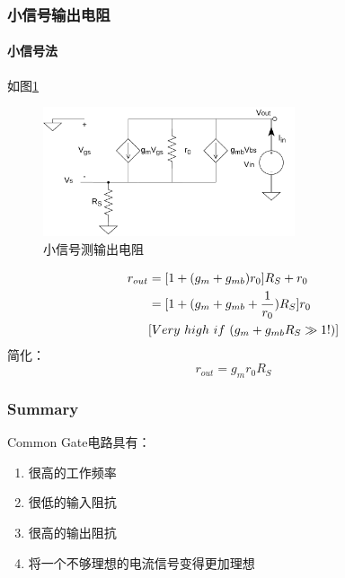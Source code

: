 \documentclass[twoside,a4paper,openright,titlepage,draft]{ctexrep}
\begin{document}
\subsubsection{小信号输出电阻}
\paragraph{小信号法}
如图\ref{fig:小信号测输出电阻}
\begin{figure}[H]
    \centering
    \includegraphics[width=0.66\textwidth]{outputimpedence.drawio.pdf}
    \caption{小信号测输出电阻}
    \label{fig:小信号测输出电阻}
\end{figure}
\begin{align}
    r_{out} &= [1 + (g_m + g_{mb})r_0]R_S + r_0 \notag \\
    &= [1 + (g_m + g_{mb} + \frac{1}{r_0})R_S]r_0 \\
    &[Very\ high\ if\ (g_m+g_{mb}R_S\gg 1!)] \notag
\end{align}
简化：
\begin{equation}
    r_{out} = g_mr_{0}R_S
\end{equation}
\subsubsection{Summary}
Common Gate电路具有：
\begin{center}
    \begin{enumerate}
        \item 很高的工作频率
        \item 很低的输入阻抗
        \item 很高的输出阻抗
        \item 将一个不够理想的电流信号变得更加理想
    \end{enumerate}    
\end{center}
\end{document}
